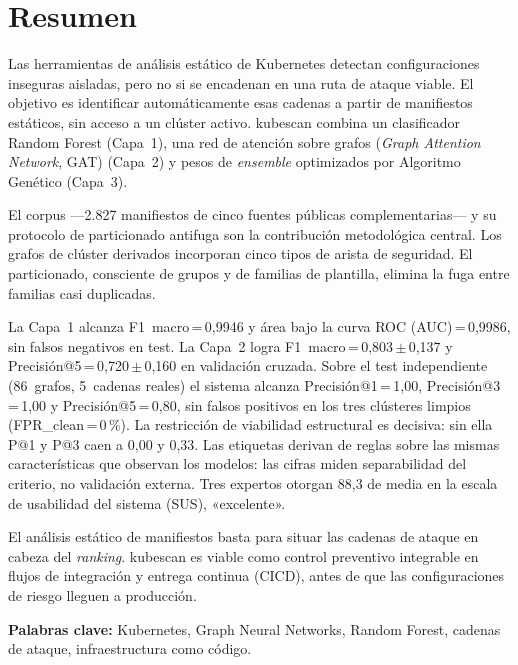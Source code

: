 \chapter{Resumen}

Las herramientas de análisis estático de Kubernetes detectan
configuraciones inseguras aisladas, pero no si se encadenan en una ruta de
ataque viable. El objetivo es identificar automáticamente esas
cadenas a partir de manifiestos estáticos, sin acceso a un clúster activo.
kubescan combina un clasificador Random Forest (Capa~1), una
red de atención sobre grafos (\textit{Graph Attention Network},
\acs{GAT}) (Capa~2) y pesos de \textit{ensemble} optimizados por
Algoritmo Genético (Capa~3).

El corpus —2.827 manifiestos de cinco fuentes públicas
complementarias— y su protocolo de particionado antifuga son la contribución
metodológica central. Los grafos de clúster derivados incorporan cinco tipos de
arista de seguridad. El particionado,
consciente de grupos y de familias de plantilla, elimina la fuga entre familias
casi duplicadas.

La Capa~1 alcanza F1~macro\,=\,0,9946 y área bajo la curva ROC
(\acs{AUC})\,=\,0,9986, sin falsos negativos en test. La Capa~2
logra F1~macro\,=\,0,803\,\(\pm\)\,0,137 y
Precisión@5\,=\,0,720\,\(\pm\)\,0,160 en validación cruzada. Sobre el test
independiente (86~grafos, 5~cadenas reales) el sistema alcanza
Precisión@1\,=\,1,00, Precisión@3\,=\,1,00 y Precisión@5\,=\,0,80, sin falsos
positivos en los tres clústeres limpios
(\acs{FPR}\_clean\,=\,0\,\%). La restricción de viabilidad
estructural es decisiva: sin ella P@1 y P@3 caen a 0,00 y 0,33. Las etiquetas
derivan de reglas sobre las mismas características que observan los modelos: las
cifras miden separabilidad del criterio, no validación externa.
Tres expertos
otorgan 88,3 de media en la escala de usabilidad del sistema
(\acs{SUS}), «excelente».

El análisis estático de manifiestos basta para situar las cadenas
de ataque en cabeza del \textit{ranking}. kubescan es viable como control
preventivo integrable en flujos de integración y entrega continua
(\acs{CICD}), antes de que las configuraciones de riesgo lleguen a
producción.

\medskip
\noindent\textbf{Palabras clave:} Kubernetes, Graph Neural Networks, Random Forest,
cadenas de ataque, infraestructura como código.

